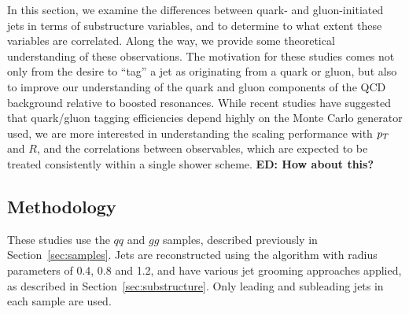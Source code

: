 In this section, we examine the differences between quark- and
gluon-initiated jets in terms of substructure variables, and to
determine to what extent these variables are correlated. Along the
way, we provide some theoretical understanding of these
observations. The motivation for these studies comes not only from the
desire to ``tag'' a jet as originating from a quark or gluon, but also
to improve our  understanding of the quark and gluon components of the
QCD background relative to boosted resonances.  While recent studies
have suggested that quark/gluon tagging efficiencies depend highly on
the Monte Carlo generator used, we are more interested in
understanding the scaling performance with $p_T$ and $R$, and the
correlations between observables, which are expected to be treated
consistently within a single shower scheme. {\bf ED: How about this?}

\subsection{Methodology}

These studies use the $qq$ and $gg$ samples, described previously in Section~\ref{sec:samples}.
Jets are reconstructed using the \antikt algorithm with 
radius parameters of 0.4, 0.8 and 1.2, and have various
jet grooming approaches applied, as described in Section~\ref{sec:substructure}. 
Only leading and subleading jets in each sample are used. 

